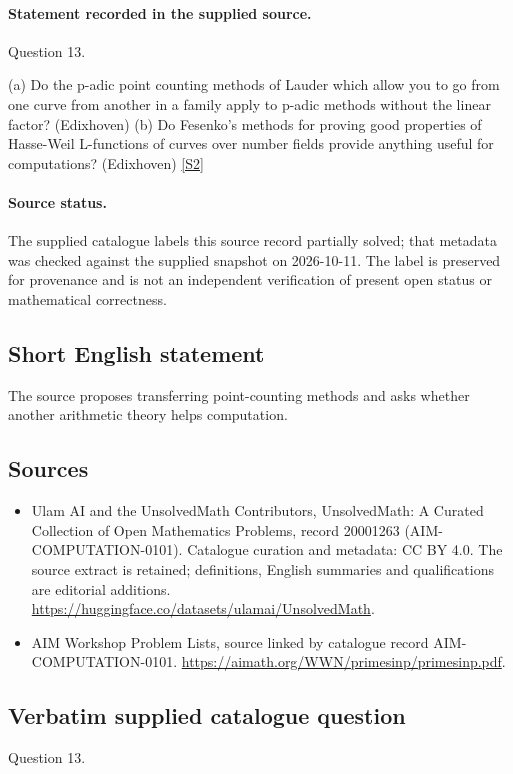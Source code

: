 \documentclass[11pt]{article}
\begin{document}
\paragraph{Statement recorded in the supplied source.}
Question 13.

(a) Do the p-adic point counting methods of Lauder which allow you to go from one curve from another in a family apply to p-adic methods without the linear factor? (Edixhoven) (b) Do Fesenko's methods for proving good properties of Hasse-Weil L-functions of curves over number fields provide anything useful for computations? (Edixhoven) \href{https://aimath.org/WWN/primesinp/primesinp.pdf}{[S2]}
\paragraph{Source status.}
The supplied catalogue labels this source record partially solved; that metadata was checked against the supplied snapshot on 2026-10-11. The label is preserved for provenance and is not an independent verification of present open status or mathematical correctness.
\subsection{Short English statement}
The source proposes transferring point-counting methods and asks whether another arithmetic theory helps computation.
\subsection{Sources}
\begin{itemize}
\item[S1] Ulam AI and the UnsolvedMath Contributors, UnsolvedMath: A Curated Collection of Open Mathematics Problems, record 20001263 (AIM-COMPUTATION-0101). Catalogue curation and metadata: CC BY 4.0. The source extract is retained; definitions, English summaries and qualifications are editorial additions.
\url{https://huggingface.co/datasets/ulamai/UnsolvedMath}.
\item[S2] AIM Workshop Problem Lists, source linked by catalogue record AIM-COMPUTATION-0101.
\url{https://aimath.org/WWN/primesinp/primesinp.pdf}.
\end{itemize}
\subsection{Verbatim supplied catalogue question}
Question 13.
\end{document}
